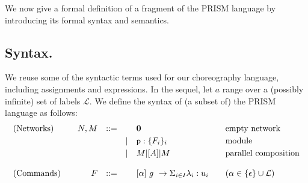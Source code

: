 We now give a formal definition of a fragment of the PRISM language by
introducing its formal syntax and semantics.

\subsection{Syntax.} We reuse some of the syntactic terms used for our
choreography language, including assignments and expressions. In the
sequel, let $a$ range over a (possibly infinite) set of labels
$\mathcal L$. We define the syntax of (a subset of) the PRISM language
as follows:
\begin{displaymath}
  \begin{array}{lrlll@{\qquad}l}
    \text{(Networks)}  \quad
    & N, M  & ::=  &      & \CEnd & \text{empty network}\\[1mm]
    &       &      & \mid & \role{p}:\{F_i\}_i & \text{module}\\[1mm]
    &       &      & \mid & M \ppp A M & \text{parallel composition}\\
    \\
    \text{(Commands)}  \quad
    & F     & ::=  &      & \command \alpha g\lambda u
                                  & \text{} (\alpha\in\{\epsilon\}\cup\mathcal L) \\
  \end{array}
\end{displaymath}
